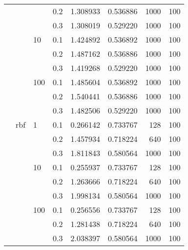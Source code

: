 \begin{table}[H]
\begin{tabular}{llllrrrr}
           &     &     & 0.2 &  1.308933 &  0.536886 &    1000 &   100 \\
           &     &     & 0.3 &  1.308019 &  0.529220 &    1000 &   100 \\
           &     & 10  & 0.1 &  1.424892 &  0.536892 &    1000 &   100 \\
           &     &     & 0.2 &  1.487162 &  0.536886 &    1000 &   100 \\
           &     &     & 0.3 &  1.419268 &  0.529220 &    1000 &   100 \\
           &     & 100 & 0.1 &  1.485604 &  0.536892 &    1000 &   100 \\
           &     &     & 0.2 &  1.540441 &  0.536886 &    1000 &   100 \\
           &     &     & 0.3 &  1.482506 &  0.529220 &    1000 &   100 \\
           & rbf & 1   & 0.1 &  0.266142 &  0.733767 &     128 &   100 \\
           &     &     & 0.2 &  1.457934 &  0.718224 &     640 &   100 \\
           &     &     & 0.3 &  1.811843 &  0.580564 &    1000 &   100 \\
           &     & 10  & 0.1 &  0.255937 &  0.733767 &     128 &   100 \\
           &     &     & 0.2 &  1.263666 &  0.718224 &     640 &   100 \\
           &     &     & 0.3 &  1.998134 &  0.580564 &    1000 &   100 \\
           &     & 100 & 0.1 &  0.256556 &  0.733767 &     128 &   100 \\
           &     &     & 0.2 &  1.281438 &  0.718224 &     640 &   100 \\
           &     &     & 0.3 &  2.038397 &  0.580564 &    1000 &   100 \\
\bottomrule
\end{tabular}
\end{table}
